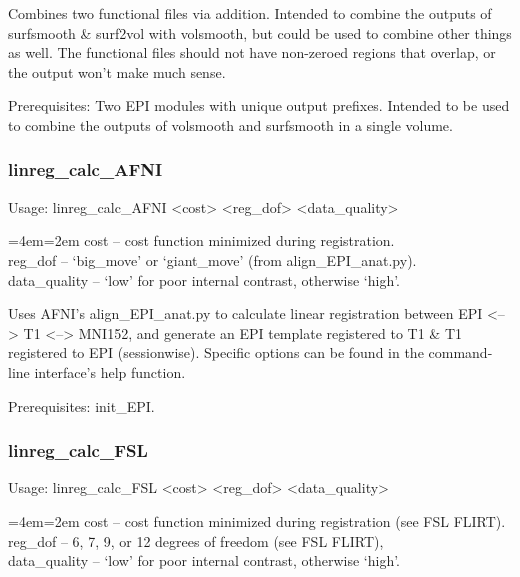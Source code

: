 \documentclass[final,titlepage,letterpaper,oneside,12pt]{article}
\renewcommand{\texttt}[2][BrickRed]{\textcolor{#1}{\ttfamily #2}}%
\newenvironment{blockquote}{%
  \par%
  \medskip
  \leftskip=4em\rightskip=2em%
  \noindent\ignorespaces}{%
  \par\medskip}
\begin{document}
\noindent Combines two functional files via addition. Intended to combine the outputs of \texttt{surfsmooth} \& \texttt{surf2vol} with \texttt{volsmooth}, but could be used to combine other things as well. The functional files should not have non-zeroed regions that overlap, or the output won't make much sense.

Prerequisites: Two EPI modules with unique output prefixes. Intended to be used to combine the outputs of \texttt{volsmooth} and \texttt{surfsmooth} in a single volume. 

\subsubsection{linreg\_calc\_AFNI}
Usage: \texttt{linreg\_calc\_AFNI <cost> <reg\_dof> <data\_quality>}

\begin{blockquote}
cost -- cost function minimized during registration. \\
reg\_dof -- `big\_move' or `giant\_move' (from align\_EPI\_anat.py). \\
data\_quality -- `low' for poor internal contrast, otherwise `high'. \
\end{blockquote}

\noindent Uses AFNI's align\_EPI\_anat.py to calculate linear registration between EPI <--> T1 <--> MNI152, and generate an EPI template registered to T1 \& T1 registered to EPI (sessionwise). Specific options can be found in the command-line interface's help function.

Prerequisites: \texttt{init\_EPI}.

\subsubsection{linreg\_calc\_FSL}
Usage: \texttt{linreg\_calc\_FSL <cost> <reg\_dof> <data\_quality>}

\begin{blockquote}
cost -- cost function minimized during registration (see FSL FLIRT). \\
reg\_dof -- 6, 7, 9, or 12 degrees of freedom (see FSL FLIRT), \\
data\_quality -- `low' for poor internal contrast, otherwise `high'. \
\end{blockquote}
\end{document}
